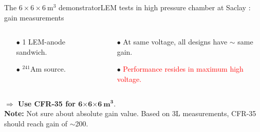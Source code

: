 \documentclass[10pt]{beamer}
\begin{document}
\begin{frame}{The \texorpdfstring{$6 \times 6 \times \SI{6}{\meter\cubed}$}{666} demonstrator}{LEM tests in high pressure chamber at Saclay : gain measurements}
\begin{scriptsize}
\begin{columns}
\begin{column}{0.58\textwidth}
    			\end{column}
    		\end{columns}\vfill
    		\begin{columns}
    			\begin{column}{0.38\textwidth}
    				\begin{itemize}
    					\item[$\bullet$] 1 LEM-anode sandwich.
    					\item[$\bullet$] $^{241}$Am source.
    				\end{itemize}
    			\end{column}\hfill
    			\begin{column}{0.58\textwidth}
    				\begin{itemize}
    					\item[$\bullet$] At same voltage, all designs have $\sim$ same gain.
    					\item[$\bullet$] \textcolor{red}{Performance resides in maximum high voltage.}
    				\end{itemize}
    			\end{column}
    		\end{columns}
    		\vfill
    		\textbf{$\Rightarrow$ Use CFR-35 for $\mathbf{6 \boldsymbol{\times} 6 \boldsymbol{\times} \SI[detect-weight]{6}{\meter\cubed}}$}.\\
    		\textbf{Note:} Not sure about absolute gain value. Based on 3L measurements, CFR-35 should reach gain of $\sim$200.
    	\end{scriptsize}
    \end{frame}
    
\end{document}
